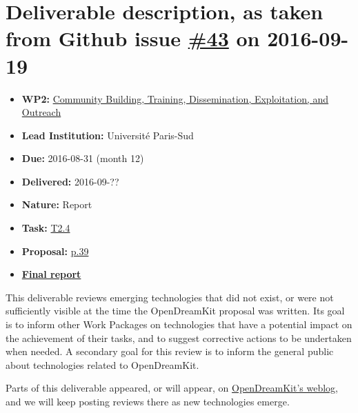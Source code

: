 \section*{\texorpdfstring{Deliverable description, as taken from Github
issue
\href{https://github.com/OpenDreamKit/OpenDreamKit/issues/43}{\#43} on
2016-09-19}{Deliverable description, as taken from Github issue \#43 on 2016-09-19}}\label{deliverable-description-as-taken-from-github-issue-43-on-2016-09-19}

\begin{itemize}
\tightlist
\item
  \textbf{WP2:}
  \href{https://github.com/OpenDreamKit/OpenDreamKit/tree/master/WP2}{Community
  Building, Training, Dissemination, Exploitation, and Outreach}
\item
  \textbf{Lead Institution:} Université Paris-Sud
\item
  \textbf{Due:} 2016-08-31 (month 12)
\item
  \textbf{Delivered:} 2016-09-??
\item
  \textbf{Nature:} Report
\item
  \textbf{Task:}
  \href{https://github.com/OpenDreamKit/OpenDreamKit/issues/27}{T2.4}
\item
  \textbf{Proposal:}
  \href{https://github.com/OpenDreamKit/OpenDreamKit/raw/master/Proposal/proposal-www.pdf}{p.39}
\item
  \textbf{\href{https://github.com/OpenDreamKit/OpenDreamKit/raw/master/WP2/D2.3/report-final.pdf}{Final
  report}}
\end{itemize}

This deliverable reviews emerging technologies that did not exist, or
were not sufficiently visible at the time the OpenDreamKit proposal was
written. Its goal is to inform other Work Packages on technologies that
have a potential impact on the achievement of their tasks, and to
suggest corrective actions to be undertaken when needed. A secondary
goal for this review is to inform the general public about technologies
related to OpenDreamKit.

Parts of this deliverable appeared, or will appear, on
\href{http://opendreamkit.org}{OpenDreamKit's weblog}, and we will keep
posting reviews there as new technologies emerge.
